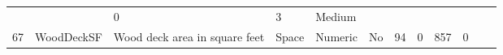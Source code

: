 \documentclass[11pt]{article}
\begin{document}
\begin{longtable}[]{@{}llllllllllll@{}}
\begin{minipage}[t]{0.04\columnwidth}
\strut
\end{minipage} & \begin{minipage}[t]{0.04\columnwidth}\raggedright\strut
\strut
\end{minipage} & \begin{minipage}[t]{0.04\columnwidth}\raggedright\strut
0\strut
\end{minipage} & \begin{minipage}[t]{0.04\columnwidth}\raggedright\strut
3\strut
\end{minipage} & \begin{minipage}[t]{0.04\columnwidth}\raggedright\strut
Medium\strut
\end{minipage}\tabularnewline
\begin{minipage}[t]{0.04\columnwidth}\raggedright\strut
67\strut
\end{minipage} & \begin{minipage}[t]{0.04\columnwidth}\raggedright\strut
WoodDeckSF\strut
\end{minipage} & \begin{minipage}[t]{0.04\columnwidth}\raggedright\strut
Wood deck area in square feet\strut
\end{minipage} & \begin{minipage}[t]{0.04\columnwidth}\raggedright\strut
Space\strut
\end{minipage} & \begin{minipage}[t]{0.04\columnwidth}\raggedright\strut
Numeric\strut
\end{minipage} & \begin{minipage}[t]{0.04\columnwidth}\raggedright\strut
No\strut
\end{minipage} & \begin{minipage}[t]{0.04\columnwidth}\raggedright\strut
94\strut
\end{minipage} & \begin{minipage}[t]{0.04\columnwidth}\raggedright\strut
0\strut
\end{minipage} & \begin{minipage}[t]{0.04\columnwidth}\raggedright\strut
857\strut
\end{minipage} & \begin{minipage}[t]{0.04\columnwidth}\raggedright\strut
0\strut
\end{minipage} & \begin{minipage}[t]{0.04\columnwidth}\raggedright\strut
\strut
\end{minipage} & \begin{minipage}[t]{0.04\columnwidth}\raggedright\strut

\end{minipage}
\end{longtable}
\end{document}
